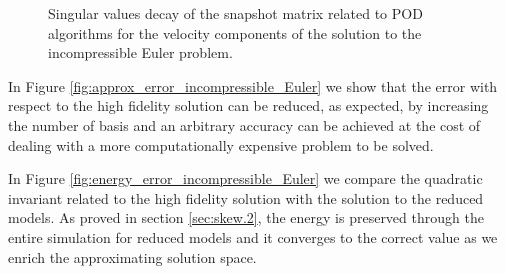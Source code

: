 \begin{figure}[h!]
\centering
{}
\caption{Singular values decay of the snapshot matrix related to POD algorithms for the velocity components of the solution to the incompressible Euler problem.}
\label{fig:RIC}
\end{figure}
In Figure \ref{fig:approx_error_incompressible_Euler} we show that the error with respect to the high fidelity solution can be reduced, as expected, by increasing the number of basis and an arbitrary accuracy can be achieved at the cost of dealing with a more computationally expensive problem to be solved.

In Figure \ref{fig:energy_error_incompressible_Euler} we compare the quadratic invariant related to the high fidelity solution with the solution to the reduced models. As proved in section \ref{sec:skew.2}, the energy is preserved through the entire simulation for reduced models and it converges to the correct value as we enrich the approximating solution space.

